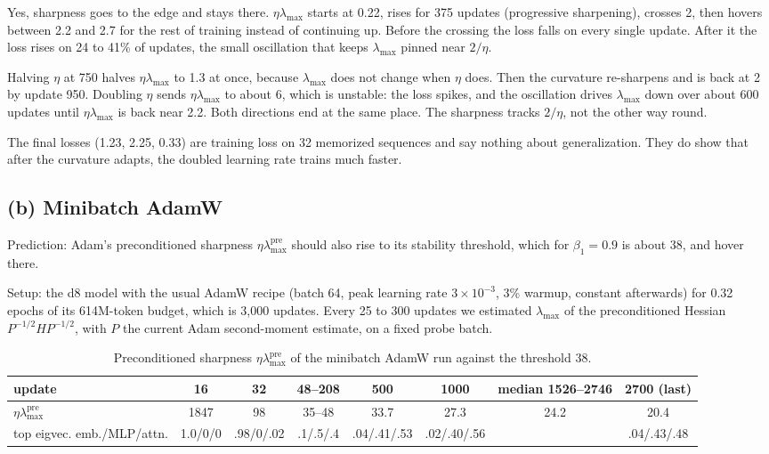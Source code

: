 \documentclass[10pt,letterpaper]{article}
\newcommand{\lmax}{\lambda_{\max}}
\begin{document}
Yes, sharpness goes to the edge and stays there. $\eta\lmax$ starts at 0.22, rises for 375 updates (progressive sharpening), crosses 2, then hovers between 2.2 and 2.7 for the rest of training instead of continuing up. Before the crossing the loss falls on every single update. After it the loss rises on 24 to 41\% of updates, the small oscillation that keeps $\lmax$ pinned near $2/\eta$.

Halving $\eta$ at 750 halves $\eta\lmax$ to 1.3 at once, because $\lmax$ does not change when $\eta$ does. Then the curvature re-sharpens and is back at 2 by update 950. Doubling $\eta$ sends $\eta\lmax$ to about 6, which is unstable: the loss spikes, and the oscillation drives $\lmax$ down over about 600 updates until $\eta\lmax$ is back near 2.2. Both directions end at the same place. The sharpness tracks $2/\eta$, not the other way round.

The final losses (1.23, 2.25, 0.33) are training loss on 32 memorized sequences and say nothing about generalization. They do show that after the curvature adapts, the doubled learning rate trains much faster.

\subsection*{(b) Minibatch AdamW}

Prediction: Adam's preconditioned sharpness $\eta\lmax^{\mathrm{pre}}$ should also rise to its stability threshold, which for $\beta_1=0.9$ is about 38, and hover there.

Setup: the d8 model with the usual AdamW recipe (batch 64, peak learning rate $3\times10^{-3}$, 3\% warmup, constant afterwards) for 0.32 epochs of its 614M-token budget, which is 3,000 updates. Every 25 to 300 updates we estimated $\lmax$ of the preconditioned Hessian $P^{-1/2}HP^{-1/2}$, with $P$ the current Adam second-moment estimate, on a fixed probe batch.

\begin{table}[H]\centering\small
\caption{Preconditioned sharpness $\eta\lmax^{\mathrm{pre}}$ of the minibatch AdamW run against the threshold 38.}
\setlength{\tabcolsep}{4pt}\footnotesize\begin{tabular}{lccccccc}\toprule
update & 16 & 32 & 48--208 & 500 & 1000 & median 1526--2746 & 2700 (last)\\\midrule
$\eta\lmax^{\mathrm{pre}}$ & 1847 & 98 & 35--48 & 33.7 & 27.3 & 24.2 & 20.4\\
top eigvec. emb./MLP/attn. & 1.0/0/0 & .98/0/.02 & .1/.5/.4 & .04/.41/.53 & .02/.40/.56 & & .04/.43/.48\\\bottomrule
\end{tabular}
\end{table}
\end{document}
